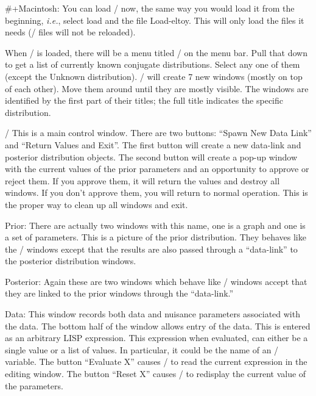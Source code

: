 \#+Macintosh: You can load \eltoy/ now, the same way you would load it from
the beginning, {\it i.e.}, select load and the file Load-eltoy.  This
will only load the files it needs (\disttoy/ files will not be
reloaded).


When \eltoy/ is loaded, there will be a menu titled \eltoy/ on the
menu bar.  Pull that down to get a list of currently known conjugate
distributions.  Select any one of them (except the Unknown
distribution).  \eltoy/ will create 7 new windows (mostly on top of
each other).  Move them around until they are mostly visible.  The
windows are identified by the first part of their titles; the full 
title indicates the specific distribution.

\item{\eltoy/} This is a main control window.  There are two buttons:
``Spawn New Data Link'' and ``Return Values and Exit''.  The first
button will create a new data-link and posterior distribution objects.
The second button will create a pop-up window with the current values
of the prior parameters and an opportunity to approve or reject them.
If you approve them, it will return the values and destroy all
windows.  If you don't approve them, you will return to normal
operation.  This is the proper way to clean up all windows and exit.


\item{Prior:}  There are actually two windows with this name, one is a
graph and one is a set of parameters.  This is a picture of the prior
distribution.  They behaves like the \disttoy/ windows except that the
results are also passed through a ``data-link'' to the posterior
distribution windows.

\item{Posterior:}  Again these are two windows which behave like
\disttoy/ windows accept that they are linked to the prior windows
through the ``data-link.''

\item{Data:}  This window records both data and nuisance parameters
associated with the data.  The bottom half of the window allows entry
of the data.  This is entered as an arbitrary LISP expression.  This
expression when evaluated, can either be a single value or a list of
values.  In particular, it could be the name of an \xlispstat/
variable.  The button ``Evaluate X'' causes \eltoy/ to read the
current expression in the editing window.  The button ``Reset X''
causes \eltoy/ to redisplay the current value of the parameters.

